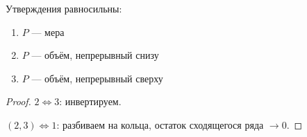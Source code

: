 \documentclass[12pt, a4paper, oneside]{memoir}
\begin{document}

\begin{theorem}
    Утверждения равносильны:

    \begin{enumerate}
        \item $P$ — мера
        \item $P$ — объём, непрерывный снизу
        \item $P$ — объём, непрерывный сверху
    \end{enumerate}
\end{theorem}

\begin{proof}
    $2 \Leftrightarrow 3$: инвертируем.

    $(2, 3) \Leftrightarrow 1$: разбиваем на кольца, остаток сходящегося ряда $→ 0$. 
\end{proof}
\end{document}
